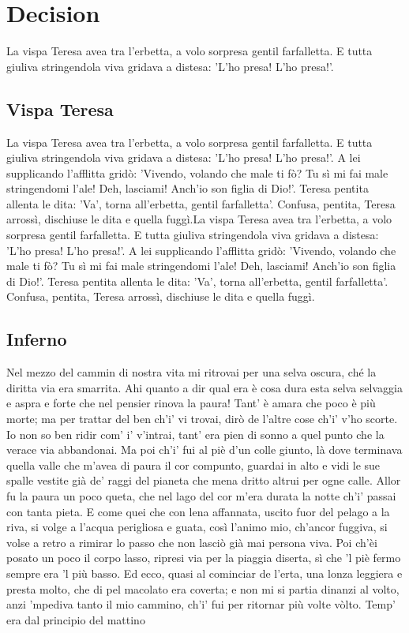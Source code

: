 \section{\huge{Decision}}
La vispa Teresa avea tra l'erbetta, a volo sorpresa gentil farfalletta. E tutta giuliva stringendola viva gridava a distesa: 'L'ho presa! L'ho presa!'. 

\subsection{Vispa Teresa}
La vispa Teresa avea tra l'erbetta, a volo sorpresa gentil farfalletta. E tutta giuliva stringendola viva gridava a distesa: 'L'ho presa! L'ho presa!'. A lei supplicando l'afflitta gridò: 'Vivendo, volando che male ti fò? Tu sì mi fai male stringendomi l'ale! Deh, lasciami! Anch'io son figlia di Dio!'. Teresa pentita allenta le dita: 'Va', torna all'erbetta, gentil farfalletta'. Confusa, pentita, Teresa arrossì, dischiuse le dita e quella fuggì.La vispa Teresa avea tra l'erbetta, a volo sorpresa gentil farfalletta. E tutta giuliva stringendola viva gridava a distesa: 'L'ho presa! L'ho presa!'. A lei supplicando l'afflitta gridò: 'Vivendo, volando che male ti fò? Tu sì mi fai male stringendomi l'ale! Deh, lasciami! Anch'io son figlia di Dio!'. Teresa pentita allenta le dita: 'Va', torna all'erbetta, gentil farfalletta'. Confusa, pentita, Teresa arrossì, dischiuse le dita e quella fuggì.

\subsection{Inferno}
Nel mezzo del cammin di nostra vita mi ritrovai per una selva oscura, ché la diritta via era smarrita. Ahi quanto a dir qual era è cosa dura esta selva selvaggia e aspra e forte che nel pensier rinova la paura! Tant' è amara che poco è più morte; ma per trattar del ben ch'i' vi trovai, dirò de l'altre cose ch'i' v'ho scorte. Io non so ben ridir com' i' v'intrai, tant' era pien di sonno a quel punto che la verace via abbandonai. Ma poi ch'i' fui al piè d'un colle giunto, là dove terminava quella valle che m'avea di paura il cor compunto, guardai in alto e vidi le sue spalle vestite già de' raggi del pianeta che mena dritto altrui per ogne calle. Allor fu la paura un poco queta, che nel lago del cor m'era durata la notte ch'i' passai con tanta pieta. E come quei che con lena affannata, uscito fuor del pelago a la riva, si volge a l'acqua perigliosa e guata, così l'animo mio, ch'ancor fuggiva, si volse a retro a rimirar lo passo che non lasciò già mai persona viva. Poi ch'èi posato un poco il corpo lasso, ripresi via per la piaggia diserta, sì che 'l piè fermo sempre era 'l più basso. Ed ecco, quasi al cominciar de l'erta, una lonza leggiera e presta molto, che di pel macolato era coverta; e non mi si partia dinanzi al volto, anzi 'mpediva tanto il mio cammino, ch'i' fui per ritornar più volte vòlto. Temp' era dal principio del mattino